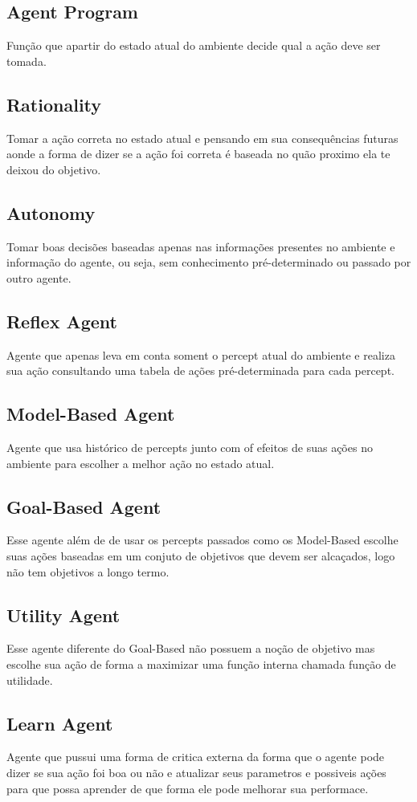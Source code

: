 \documentclass[a4paper,12pt]{article}
\begin{document}
\subsection{Agent Program}
Função que apartir do estado atual do ambiente decide qual a ação deve ser tomada.
\subsection{Rationality}
Tomar a ação correta no estado atual e pensando em sua consequências futuras aonde a forma de dizer se a ação foi correta é baseada no quão proximo ela te deixou do objetivo.
\subsection{Autonomy}
Tomar boas decisões baseadas apenas nas informações presentes no ambiente e informação do agente, ou seja, sem conhecimento pré-determinado ou passado por outro agente.
\subsection{Reflex Agent}
Agente que apenas leva em conta soment o percept atual do ambiente e realiza sua ação consultando uma tabela de ações pré-determinada para cada percept.
\subsection{Model-Based Agent}
Agente que usa histórico de percepts junto com of efeitos de suas ações no ambiente para escolher a melhor ação no estado atual.
\subsection{Goal-Based Agent}
Esse agente além de de usar os percepts passados como os Model-Based escolhe suas ações baseadas em um conjuto de objetivos que devem ser alcaçados, logo não tem objetivos a longo termo.
\subsection{Utility Agent}
Esse agente diferente do Goal-Based não possuem a noção de objetivo mas escolhe sua ação de forma a maximizar uma função interna chamada função de utilidade.
\subsection{Learn Agent}
Agente que pussui uma forma de critica externa da forma que o agente pode dizer se sua ação foi boa ou não e atualizar seus parametros e possiveis ações para que possa aprender de que forma ele pode melhorar sua performace.
\end{document}
